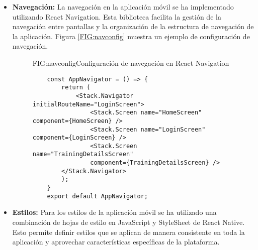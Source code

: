 \begin{itemize}
\begin{itemize}
\begin{itemize}
\begin{itemize}
                \item \texttt{FoodDetailsScreen.js} - Pantalla de detalles de alimentos.
                \item \texttt{HomeScreen.js} - Pantalla de inicio.
                \item \texttt{LoginScreen.js} - Pantalla de inicio de sesión.
                \item \texttt{TodayScreen.js} - Muestra los entrenamientos y comidas del día.
                \item \texttt{TrainingDetailsScreen.js} - Pantalla de detalles del entrenamiento.
            \end{itemize}
        \end{itemize}
    \end{itemize}

    \item \textbf{Navegación:} La navegación en la aplicación móvil se ha implementado utilizando React Navigation. Esta biblioteca facilita la gestión de la navegación entre pantallas y la organización de la estructura de navegación de la aplicación. Figura \ref{FIG:navconfig} muestra un ejemplo de configuración de navegación.
    \begin{figure}[Configuración de Navegación]{FIG:navconfig}{Configuración de navegación en React Navigation}
    \begin{verbatim}
    const AppNavigator = () => {
        return (
            <Stack.Navigator initialRouteName="LoginScreen">
                <Stack.Screen name="HomeScreen" component={HomeScreen} />
                <Stack.Screen name="LoginScreen" component={LoginScreen} />
                <Stack.Screen name="TrainingDetailsScreen" 
                component={TrainingDetailsScreen} />
        </Stack.Navigator>
        );
    }
    export default AppNavigator;
    \end{verbatim}
    \end{figure}

    \item \textbf{Estilos:} Para los estilos de la aplicación móvil se ha utilizado una combinación de hojas de estilo en JavaScript y StyleSheet de React Native. Esto permite definir estilos que se aplican de manera consistente en toda la aplicación y aprovechar características específicas de la plataforma.


\end{itemize}
